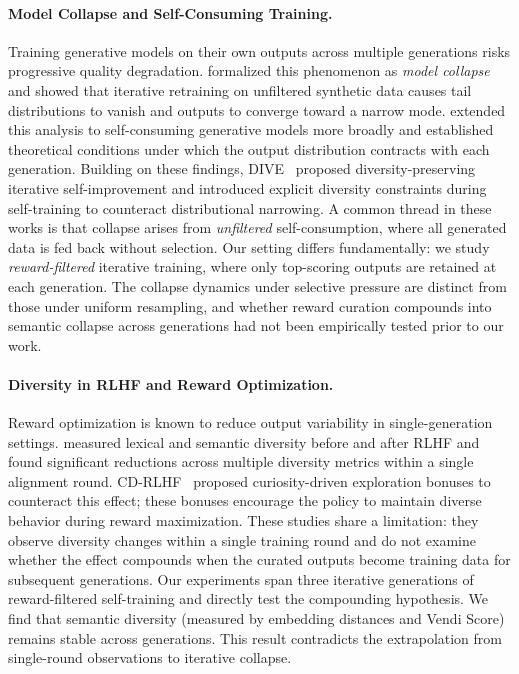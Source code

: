 
\paragraph{Model Collapse and Self-Consuming Training.}
Training generative models on their own outputs across multiple generations risks progressive quality degradation.
\cite{placeholder_shumailov} formalized this phenomenon as \emph{model collapse} and showed that iterative retraining on unfiltered synthetic data causes tail distributions to vanish and outputs to converge toward a narrow mode.
\cite{placeholder_alemohammad} extended this analysis to self-consuming generative models more broadly and established theoretical conditions under which the output distribution contracts with each generation.
Building on these findings, DIVE~\cite{placeholder_dive} proposed diversity-preserving iterative self-improvement and introduced explicit diversity constraints during self-training to counteract distributional narrowing.
A common thread in these works is that collapse arises from \emph{unfiltered} self-consumption, where all generated data is fed back without selection.
Our setting differs fundamentally: we study \emph{reward-filtered} iterative training, where only top-scoring outputs are retained at each generation.
The collapse dynamics under selective pressure are distinct from those under uniform resampling, and whether reward curation compounds into semantic collapse across generations had not been empirically tested prior to our work.

\paragraph{Diversity in RLHF and Reward Optimization.}
Reward optimization is known to reduce output variability in single-generation settings.
\cite{placeholder_kirk} measured lexical and semantic diversity before and after RLHF and found significant reductions across multiple diversity metrics within a single alignment round.
CD-RLHF~\cite{placeholder_cdrlhf} proposed curiosity-driven exploration bonuses to counteract this effect; these bonuses encourage the policy to maintain diverse behavior during reward maximization.
These studies share a limitation: they observe diversity changes within a single training round and do not examine whether the effect compounds when the curated outputs become training data for subsequent generations.
Our experiments span three iterative generations of reward-filtered self-training and directly test the compounding hypothesis.
We find that semantic diversity (measured by embedding distances and Vendi Score) remains stable across generations. This result contradicts the extrapolation from single-round observations to iterative collapse.

